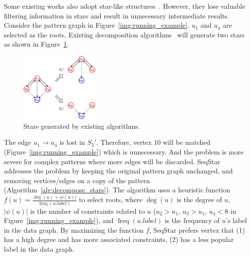 
Some existing works also adopt star-like structures~\cite{DBLP:journals/pvldb/SunWWSL12,DBLP:journals/pvldb/LaiQLC15}. However, they lose valuable filtering information in stars and result in unnecessary intermediate results.
Consider the pattern graph in Figure~\ref{img:running_example}. $u_1$ and $u_4$ are selected as the roots.
Existing decomposition algorithms~\cite{DBLP:journals/pvldb/SunWWSL12,DBLP:journals/pvldb/LaiQLC15} will generate two stars as shown in Figure~\ref{img:stwig}.
\begin{figure}[ht]
  \centering
  \includegraphics[width=0.35\textwidth]{img/stwig.pdf}
  \caption{Stars generated by existing algorithms.}\label{img:stwig}
\end{figure}
The edge $u_1 \rightarrow u_4$ is lost in $S_2'$.
Therefore, vertex $10$ will be matched (Figure~\ref{img:running_example}) which is unnecessary.
And the problem is more severe for complex patterns where more edges will be discarded.
SeqStar addresses the problem by keeping the original pattern graph unchanged, and removing vertices/edges on a copy of the pattern (Algorithm~\ref{alg:decompose_stars}).
The algorithm uses a heuristic function $f(u) = \frac{\deg(u) + |\psi(u)|}{\operatorname{freq}(u.label)}$ to select roots,
where $\deg(u)$ is the degree of $u$, $|\psi(u)|$ is the number of constraints related to $u$ ($u_2 > u_1$, $u_3 > u_1$, $u_4 < 8$ in Figure~\ref{img:running_example}),
and $\operatorname{freq}(u.label)$ is the frequency of $u$'s label in the data graph.
By maximizing the function $f$,
SeqStar prefers vertex that
(1) has a high degree and has more associated constraints,
(2) has a less popular label in the data graph.

